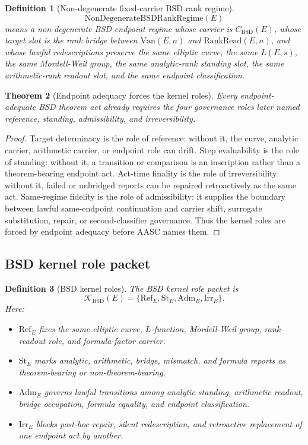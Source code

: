 \documentclass[11pt]{article}
\newtheorem{theorem}{Theorem}[section]
\newtheorem{definition}[theorem]{Definition}
\newcommand{\BSD}{\mathrm{BSD}}
\newcommand{\Van}{\mathrm{Van}}
\newcommand{\RankRead}{\mathrm{RankRead}}
\newcommand{\RefK}{\mathrm{Ref}}
\newcommand{\St}{\mathrm{St}}
\newcommand{\Adm}{\mathrm{Adm}}
\newcommand{\Irr}{\mathrm{Irr}}
\newcommand{\Kern}{\mathcal{K}}
\newcommand{\NonDegBSD}{\mathrm{NonDegenerateBSDRankRegime}}
\begin{document}
\begin{definition}[Non-degenerate fixed-carrier BSD rank regime]\label{def:nondeg-fixed-bsd-rank}
\[
\NonDegBSD(E)
\]
means a non-degenerate BSD endpoint regime whose carrier is $C_{\BSD}(E)$, whose target slot is the rank bridge between $\Van(E,n)$ and $\RankRead(E,n)$, and whose lawful redescriptions preserve the same elliptic curve, the same $L(E,s)$, the same Mordell-Weil group, the same analytic-rank standing slot, the same arithmetic-rank readout slot, and the same endpoint classification.
\end{definition}

\begin{theorem}[Endpoint adequacy forces the kernel roles]\label{thm:adequacy-forces-kernel-roles}
Every endpoint-adequate BSD theorem act already requires the four governance roles later named reference, standing, admissibility, and irreversibility.
\end{theorem}

\begin{proof}
Target determinacy is the role of reference: without it, the curve, analytic carrier, arithmetic carrier, or endpoint role can drift. Step evaluability is the role of standing: without it, a transition or comparison is an inscription rather than a theorem-bearing endpoint act. Act-time finality is the role of irreversibility: without it, failed or unbridged reports can be repaired retroactively as the same act. Same-regime fidelity is the role of admissibility: it supplies the boundary between lawful same-endpoint continuation and carrier shift, surrogate substitution, repair, or second-classifier governance. Thus the kernel roles are forced by endpoint adequacy before AASC names them.
\end{proof}

\subsection{BSD kernel role packet}

\begin{definition}[BSD kernel roles]\label{def:bsd-kernel-roles}
The BSD kernel role packet is
\[
\Kern_{\BSD}(E)=\{\RefK_E,\St_E,\Adm_E,\Irr_E\}.
\]
Here:
\begin{itemize}
\item $\RefK_E$ fixes the same elliptic curve, $L$-function, Mordell-Weil group, rank-readout role, and formula-factor carrier.
\item $\St_E$ marks analytic, arithmetic, bridge, mismatch, and formula reports as theorem-bearing or non-theorem-bearing.
\item $\Adm_E$ governs lawful transitions among analytic standing, arithmetic readout, bridge occupation, formula equality, and endpoint classification.
\item $\Irr_E$ blocks post-hoc repair, silent redescription, and retroactive replacement of one endpoint act by another.
\end{itemize}
\end{definition}
\end{document}

